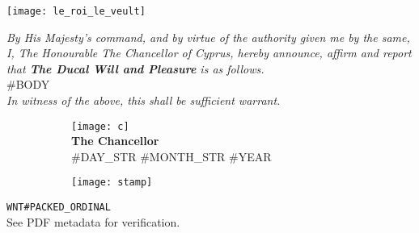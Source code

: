 \documentclass[varwidth=true,border=50pt]{standalone}
\begin{document}
\noindent \texttt{[image: le\_roi\_le\_veult]}

\vspace{10pt}

\textit{By His Majesty's command, and by virtue of the authority given me by the same, I, The Honourable The Chancellor of Cyprus, hereby announce, affirm and report that \textbf{The Ducal Will and Pleasure} is as follows.}\\

#BODY\\

\textit{In witness of the above, this shall be sufficient warrant.}

\vspace{20pt}

\begin{figure}
\centering
\begin{subfigure}{.5\textwidth}
    \centering
    \texttt{[image: c]}\\
    \vspace{5pt}
    \textbf{The Chancellor}\\
    #DAY_STR #MONTH_STR #YEAR
\end{subfigure}%
\begin{subfigure}{.5\textwidth}
    \centering
    \texttt{[image: stamp]}
\end{subfigure}%
\end{figure}

\vspace{30pt}

\hfill {\footnotesize \texttt{WNT#PACKED_ORDINAL}}\\

{\tiny See PDF metadata for verification.}
\end{document}
